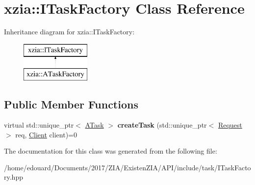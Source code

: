 \hypertarget{classxzia_1_1ITaskFactory}{}\section{xzia\+:\+:I\+Task\+Factory Class Reference}
\label{classxzia_1_1ITaskFactory}
Inheritance diagram for xzia\+:\+:I\+Task\+Factory\+:\begin{figure}[H]
\begin{center}
\leavevmode
\includegraphics[height=2.000000cm]{classxzia_1_1ITaskFactory}
\end{center}
\end{figure}
\subsection*{Public Member Functions}
\begin{DoxyCompactItemize}
\item 
\mbox{\label{classxzia_1_1ITaskFactory_a2fdce8ea701c55eb73d00efd8f367c2c}} 
virtual std\+::unique\+\_\+ptr$<$ \mbox{\hyperlink{classxzia_1_1ATask}{A\+Task}} $>$ {\bfseries create\+Task} (std\+::unique\+\_\+ptr$<$ \mbox{\hyperlink{structxzia_1_1Request}{Request}} $>$ req, \mbox{\hyperlink{structClient}{Client}} client)=0
\end{DoxyCompactItemize}


The documentation for this class was generated from the following file\+:\begin{DoxyCompactItemize}
\item 
/home/edouard/\+Documents/2017/\+Z\+I\+A/\+Existen\+Z\+I\+A/\+A\+P\+I/include/task/I\+Task\+Factory.\+hpp\end{DoxyCompactItemize}
